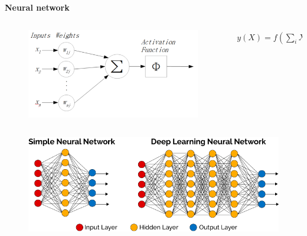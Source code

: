 \documentclass[xcolor=dvipsnames]{beamer}
\begin{document}
\begin{frame}{\bf Neural network}

\begin{columns}


    \begin{column}{0.4\textwidth}


    \begin{figure}
      \includegraphics[scale=0.4]{../../diagrams/neuron_model.png}
    \end{figure}

    \end{column}

    \begin{column}{0.5\textwidth}  %

    \begin{align*}
     y(X) = f(\sum_{i} X_iW_i + b)
    \end{align*}

    \end{column}

\end{columns}


  \begin{figure}
    \includegraphics[scale=0.3]{../../diagrams/deep_nn.png}
  \end{figure}

\end{frame}
\end{document}

